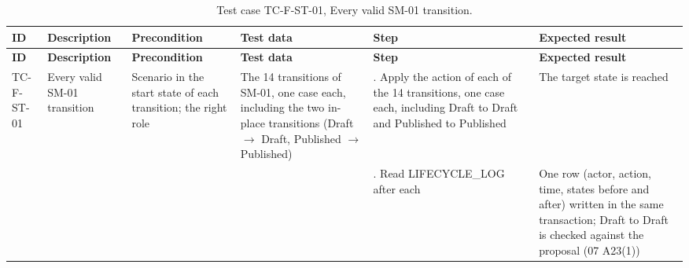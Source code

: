 {\footnotesize{}\renewcommand{\arraystretch}{1.1}
\begin{longtable}{|>{\raggedright\arraybackslash}p{}|>{\raggedright\arraybackslash}p{}|>{\raggedright\arraybackslash}p{}|>{\raggedright\arraybackslash}p{}|>{\raggedright\arraybackslash}p{}|>{\raggedright\arraybackslash}p{}|}
\caption{Test case TC-F-ST-01, Every valid SM-01 transition.} \\
\hline
\textbf{ID} & \textbf{Description} & \textbf{Precondition} & \textbf{Test data} & \textbf{Step} & \textbf{Expected result} \\ \hline
\endfirsthead
\hline
\textbf{ID} & \textbf{Description} & \textbf{Precondition} & \textbf{Test data} & \textbf{Step} & \textbf{Expected result} \\ \hline
\endhead
TC-F-ST-01 & Every valid SM-01 transition & Scenario in the start state of each transition; the right role & The 14 transitions of SM-01, one case each, including the two in-place transitions (Draft $\rightarrow$ Draft, Published $\rightarrow$ Published) & 1. Apply the action of each of the 14 transitions, one case each, including Draft to Draft and Published to Published & The target state is reached \\ \cline{5-6}
 &  &  &  & 2. Read LIFECYCLE\_\allowbreak{}LOG after each & One row (actor, action, time, states before and after) written in the same transaction; Draft to Draft is checked against the proposal (07 A23(1)) \\ \hline
\end{longtable}
}

